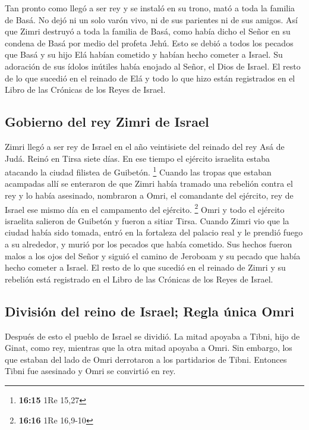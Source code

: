  Tan pronto como llegó a ser rey y se instaló en su
trono, mató a toda la familia de Basá. No dejó ni un solo varón vivo, ni
de sus parientes ni de sus amigos.  Así que Zimri
destruyó a toda la familia de Basá, como había dicho el Señor en su
condena de Basá por medio del profeta Jehú.  Esto se
debió a todos los pecados que Basá y su hijo Elá habían cometido y
habían hecho cometer a Israel. Su adoración de sus ídolos inútiles había
enojado al Señor, el Dios de Israel.  El resto de lo que
sucedió en el reinado de Elá y todo lo que hizo están registrados en el
Libro de las Crónicas de los Reyes de Israel.

\hypertarget{gobierno-del-rey-zimri-de-israel}{%
\subsection{Gobierno del rey Zimri de
Israel}\label{gobierno-del-rey-zimri-de-israel}}

 Zimri llegó a ser rey de Israel en el año veintisiete
del reinado del rey Asá de Judá. Reinó en Tirsa siete días. En ese
tiempo el ejército israelita estaba atacando la ciudad filistea de
Guibetón. \footnote{\textbf{16:15} 1Re 15,27}  Cuando las
tropas que estaban acampadas allí se enteraron de que Zimri había
tramado una rebelión contra el rey y lo había asesinado, nombraron a
Omri, el comandante del ejército, rey de Israel ese mismo día en el
campamento del ejército. \footnote{\textbf{16:16} 1Re 16,9-10}
 Omri y todo el ejército israelita salieron de Guibetón y
fueron a sitiar Tirsa.  Cuando Zimri vio que la ciudad
había sido tomada, entró en la fortaleza del palacio real y le prendió
fuego a su alrededor, y murió por los pecados que había cometido.
 Sus hechos fueron malos a los ojos del Señor y siguió el
camino de Jeroboam y su pecado que había hecho cometer a Israel.
 El resto de lo que sucedió en el reinado de Zimri y su
rebelión está registrado en el Libro de las Crónicas de los Reyes de
Israel.

\hypertarget{divisiuxf3n-del-reino-de-israel-regla-uxfanica-omri}{%
\subsection{División del reino de Israel; Regla única
Omri}\label{divisiuxf3n-del-reino-de-israel-regla-uxfanica-omri}}

 Después de esto el pueblo de Israel se dividió. La mitad
apoyaba a Tibni, hijo de Ginat, como rey, mientras que la otra mitad
apoyaba a Omri.  Sin embargo, los que estaban del lado de
Omri derrotaron a los partidarios de Tibni. Entonces Tibni fue asesinado
y Omri se convirtió en rey.

